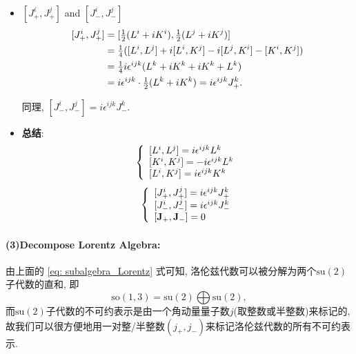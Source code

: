 \begin{itemize}
\begin{equation}
\begin{aligned}
          \end{aligned}
        \end{equation}
  \item $[J_+^i, J_+^j]$ and $[J_-^i, J_-^j]$
        \begin{equation}
          \begin{aligned}
            \relax[J_+^i, J_+^j] & = [\tfrac{1}{2}(L^i+iK^i), \tfrac{1}{2}(L^j+iK^j)]                   \\
                                 & = \tfrac{1}{4}([L^i, L^j]+i[L^i, K^j]-i[L^j, K^i]-[K^i, K^j])        \\
                                 & = \tfrac{1}{4}i\epsilon^{ijk}(L^k + iK^k + iK^k + L^k)               \\
                                 & = i\epsilon^{ijk}\cdot\tfrac{1}{2}(L^k+iK^k) = i\epsilon^{ijk}J_+^k.
          \end{aligned}
        \end{equation}

        同理, $[J_-^i, J_-^j] = i\epsilon^{ijk}J_-^k$.
  \item \textbf{总结}:
        \begin{equation}
          \left\{\begin{array}{l}
            \relax[L^i, L^j] = i\epsilon^{ijk}L^k  \\
            \relax[K^i, K^j] = -i\epsilon^{ijk}L^k \\
            \relax[L^i, K^j] = i\epsilon^{ijk}K^k
          \end{array} \right.
        \end{equation}
        \begin{equation}{\label{eq: subalgebra_Lorentz}}
          \left\{\begin{array}{l}
            \relax[J_+^i, J_+^j] = i\epsilon^{ijk}J_+^k \\
            \relax[J_-^i, J_-^j] = i\epsilon^{ijk}J_-^k \\
            \relax[\mathbf{J}_+, \mathbf{J}_-] = 0
          \end{array} \right.
        \end{equation}
\end{itemize}

\paragraph*{(3)Decompose Lorentz Algebra: }
由上面的 \eqref{eq: subalgebra_Lorentz} 式可知, 洛伦兹代数可以被分解为两个$\text{su}(2)$子代数的直和, 即
\begin{equation}
  \text{so}(1, 3) = \text{su}(2) \bigoplus \text{su}(2),
\end{equation}
而$\text{su}(2)$子代数的不可约表示是由一个角动量量子数$j$(取整数或半整数)来标记的, 故我们可以很方便地用一对整/半整数$(j_+, j_-)$来标记洛伦兹代数的所有不可约表示.

